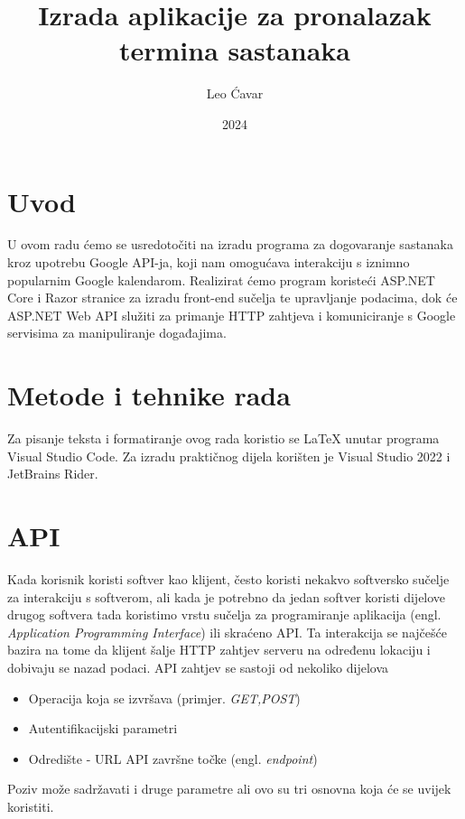 \documentclass{foi}
\title{Izrada aplikacije za pronalazak termina sastanaka}
\author{Leo Ćavar}
\date{2024}
\begin{document}
\maketitle

\tableofcontents

\pagestyle{plain}
\chapter{Uvod}
U ovom radu ćemo se usredotočiti na izradu programa za dogovaranje sastanaka kroz upotrebu Google API-ja, koji nam omogućava interakciju s iznimno popularnim Google kalendarom. Realizirat ćemo program koristeći ASP.NET Core i Razor stranice za izradu front-end sučelja te upravljanje podacima, dok će ASP.NET Web API služiti za primanje HTTP zahtjeva i komuniciranje s Google servisima za manipuliranje događajima.

\chapter{Metode i tehnike rada}
Za pisanje teksta i formatiranje ovog rada koristio se LaTeX unutar programa Visual Studio Code. Za izradu praktičnog dijela korišten je Visual Studio 2022 i JetBrains Rider.

\chapter{API}
Kada korisnik koristi softver kao klijent, često koristi nekakvo softversko sučelje za interakciju s softverom, ali kada je potrebno da jedan softver koristi dijelove drugog softvera tada koristimo vrstu sučelja za programiranje aplikacija (engl. \textit{Application Programming Interface}) ili skraćeno API.\cite{biehl2015api}
Ta interakcija se najčešće bazira na tome da klijent šalje HTTP zahtjev serveru na određenu lokaciju i dobivaju se nazad podaci.
API zahtjev se sastoji od nekoliko dijelova \cite{altexsoft}
\begin{itemize}
    \item Operacija koja se izvršava (primjer. \textit{GET,POST})
    \item Autentifikacijski parametri
    \item Odredište - URL API završne točke (engl. \textit{endpoint})
\end{itemize}
Poziv može sadržavati i druge parametre ali ovo su tri osnovna koja će se uvijek koristiti.
\end{document}
